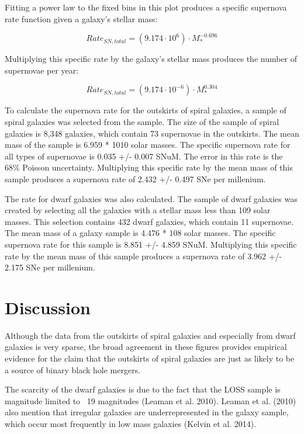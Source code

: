 \documentclass[apj]{emulateapj}
\begin{document}
Fitting a power law to the fixed bins in this plot produces a specific supernova rate function given a galaxy’s stellar mass:

\begin{equation}
Rate_{SN,total}=(9.174 \cdot 10^6) \cdot M_*^{-0.696}
\end{equation}

Multiplying this specific rate by the galaxy’s stellar mass produces the number of supernovae per year:

\begin{equation}
Rate_{SN,total}=(9.174 \cdot 10^{-6}) \cdot M_*^{0.304}
\end{equation}

To calculate the supernova rate for the outskirts of spiral galaxies, a sample of spiral galaxies was selected from the sample. The size of the sample of spiral galaxies is 8,348 galaxies, which contain 73 supernovae in the outskirts. The mean mass of the sample is 6.959 * 1010 solar masses. The specific supernova rate for all types of supernovae is 0.035 +/- 0.007 SNuM. The error in this rate is the 68\% Poisson uncertainty. Multiplying this specific rate by the mean mass of this sample produces a supernova rate of 2.432 +/- 0.497 SNe per millenium.

The rate for dwarf galaxies was also calculated. The sample of dwarf galaxies was created by selecting all the galaxies with a stellar mass less than 109 solar masses. This selection contains 432 dwarf galaxies, which contain 11 supernovae. The mean mass of a galaxy sample is 4.476 * 108 solar masses. The specific supernova rate for this sample is 8.851 +/- 4.859 SNuM. Multiplying this specific rate by the mean mass of this sample produces a supernova rate of 3.962 +/- 2.175 SNe per millenium.

\section{Discussion}

Although the data from the outskirts of spiral galaxies and especially from dwarf galaxies is very sparse, the broad agreement in these figures provides empirical evidence for the claim that the outskirts of spiral galaxies are just as likely to be a source of binary black hole mergers.

The scarcity of the dwarf galaxies is due to the fact that the LOSS sample is magnitude limited to ~19 magnitudes (Leaman et al. 2010). Leaman et al. (2010) also mention that irregular galaxies are underrepresented in the galaxy sample, which occur most frequently in low mass galaxies (Kelvin et al. 2014).
\end{document}
